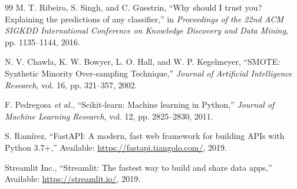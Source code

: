 \begin{thebibliography}{99}
M. T. Ribeiro, S. Singh, and C. Guestrin, ``Why should I trust you? Explaining the predictions of any classifier,'' in \textit{Proceedings of the 22nd ACM SIGKDD International Conference on Knowledge Discovery and Data Mining}, pp. 1135--1144, 2016.

N. V. Chawla, K. W. Bowyer, L. O. Hall, and W. P. Kegelmeyer, ``SMOTE: Synthetic Minority Over-sampling Technique,'' \textit{Journal of Artificial Intelligence Research}, vol. 16, pp. 321--357, 2002.

F. Pedregosa \textit{et al.}, ``Scikit-learn: Machine learning in Python,'' \textit{Journal of Machine Learning Research}, vol. 12, pp. 2825--2830, 2011.

S. Ram\'{i}rez, ``FastAPI: A modern, fast web framework for building APIs with Python 3.7+,'' Available: \url{https://fastapi.tiangolo.com/}, 2019.

Streamlit Inc., ``Streamlit: The fastest way to build and share data apps,'' Available: \url{https://streamlit.io/}, 2019.

\end{thebibliography}
